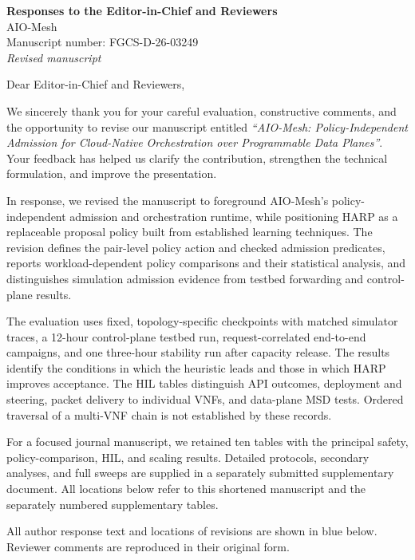 \documentclass[11pt]{article}
\newcounter{reviewer}
\newcounter{comment}[reviewer]
\begin{document}
\begin{center}
{\LARGE\bfseries Responses to the Editor-in-Chief and Reviewers}\\[3mm]
{\large AIO-Mesh}\\[2mm]
Manuscript number: FGCS-D-26-03249\\[1mm]\textit{Revised manuscript}
\end{center}
Dear Editor-in-Chief and Reviewers,

We sincerely thank you for your careful evaluation, constructive comments, and the opportunity to revise our manuscript entitled \textit{``AIO-Mesh: Policy-Independent Admission for Cloud-Native Orchestration over Programmable Data Planes''}. Your feedback has helped us clarify the contribution, strengthen the technical formulation, and improve the presentation.

\textcolor{replyblue}{In response, we revised the manuscript to foreground AIO-Mesh's policy-independent admission and orchestration runtime, while positioning HARP as a replaceable proposal policy built from established learning techniques. The revision defines the pair-level policy action and checked admission predicates, reports workload-dependent policy comparisons and their statistical analysis, and distinguishes simulation admission evidence from testbed forwarding and control-plane results.}

\textcolor{replyblue}{The evaluation uses fixed, topology-specific checkpoints with matched simulator traces, a 12-hour control-plane testbed run, request-correlated end-to-end campaigns, and one three-hour stability run after capacity release. The results identify the conditions in which the heuristic leads and those in which HARP improves acceptance. The HIL tables distinguish API outcomes, deployment and steering, packet delivery to individual VNFs, and data-plane MSD tests. Ordered traversal of a multi-VNF chain is not established by these records.}

\textcolor{replyblue}{For a focused journal manuscript, we retained ten tables with the principal safety, policy-comparison, HIL, and scaling results. Detailed protocols, secondary analyses, and full sweeps are supplied in a separately submitted supplementary document. All locations below refer to this shortened manuscript and the separately numbered supplementary tables.}

\textcolor{replyblue}{All author response text and locations of revisions are shown in blue below. Reviewer comments are reproduced in their original form.}
\end{document}
